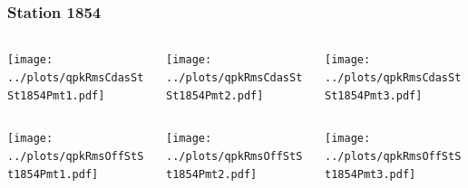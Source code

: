 \documentclass[aspectratio=169]{beamer}
\begin{document}
\begin{frame} 
  \frametitle{Station 1854}
  \begin{center}
    \begin{columns}
      \begin{column}{0.33\textwidth}
        \texttt{[image: ../plots/qpkRmsCdasStSt1854Pmt1.pdf]}
      \end{column}
      \begin{column}{0.33\textwidth}
        \texttt{[image: ../plots/qpkRmsCdasStSt1854Pmt2.pdf]}
      \end{column}
      \begin{column}{0.33\textwidth}
        \texttt{[image: ../plots/qpkRmsCdasStSt1854Pmt3.pdf]}
      \end{column}
    \end{columns}
  \end{center}

  \begin{center}
    \begin{columns}
      \begin{column}{0.33\textwidth}
        \texttt{[image: ../plots/qpkRmsOffStSt1854Pmt1.pdf]}
      \end{column}
      \begin{column}{0.33\textwidth}
        \texttt{[image: ../plots/qpkRmsOffStSt1854Pmt2.pdf]}
      \end{column}
      \begin{column}{0.33\textwidth}
        \texttt{[image: ../plots/qpkRmsOffStSt1854Pmt3.pdf]}
      \end{column}
    \end{columns}
  \end{center}
\end{frame}
\end{document}
